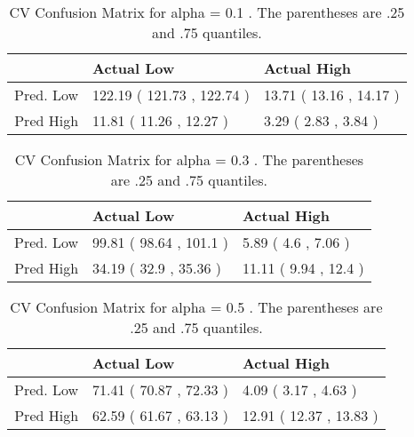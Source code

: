 \begin{table}[H]
\begin{center}
\begin{tabular}{rll}
  \hline
 & Actual Low & Actual High \\ 
  \hline
Pred. Low & 122.19 ( 121.73 , 122.74 ) & 13.71 ( 13.16 , 14.17 ) \\ 
  Pred High & 11.81 ( 11.26 , 12.27 ) & 3.29 ( 2.83 , 3.84 ) \\ 
   \hline
\end{tabular}
\caption{CV Confusion Matrix for alpha = 0.1 . The parentheses are .25 and .75 quantiles.}
\end{center}
\end{table}
\begin{table}[H]
\begin{center}
\begin{tabular}{rll}
  \hline
 & Actual Low & Actual High \\ 
  \hline
Pred. Low & 99.81 ( 98.64 , 101.1 ) & 5.89 ( 4.6 , 7.06 ) \\ 
  Pred High & 34.19 ( 32.9 , 35.36 ) & 11.11 ( 9.94 , 12.4 ) \\ 
   \hline
\end{tabular}
\caption{CV Confusion Matrix for alpha = 0.3 . The parentheses are .25 and .75 quantiles.}
\end{center}
\end{table}
\begin{table}[H]
\begin{center}
\begin{tabular}{rll}
  \hline
 & Actual Low & Actual High \\ 
  \hline
Pred. Low & 71.41 ( 70.87 , 72.33 ) & 4.09 ( 3.17 , 4.63 ) \\ 
  Pred High & 62.59 ( 61.67 , 63.13 ) & 12.91 ( 12.37 , 13.83 ) \\ 
   \hline
\end{tabular}
\caption{CV Confusion Matrix for alpha = 0.5 . The parentheses are .25 and .75 quantiles.}
\end{center}
\end{table}
